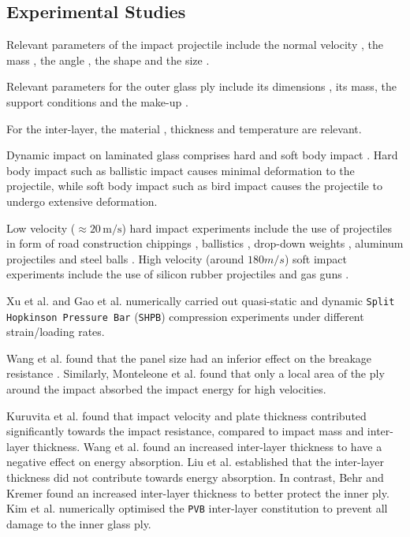\documentclass[format=acmtog, 12pt, screen=true, review=false]{acmart}
\begin{document}

\subsection{Experimental Studies}

Relevant parameters of the impact projectile include the normal velocity \cite{Gra98, Kur14, Dar13, Wu14}, the mass \cite{Kur14, Dar13}, the angle \cite{Gra98, Kur14, Dar13}, the shape \cite{Dar13} and the size \cite{Wu14}.

\bigbreak
Relevant parameters for the outer glass ply include its dimensions \cite{Wan18}, its mass, the support conditions \cite{Wan18} and the make-up \cite{Wan18}.

\bigbreak
For the inter-layer, the material \cite{Moh18, Wan18, Mon04}, thickness \cite{Ji98, Kur14, Wan18} and temperature \cite{Moh18, Zha19} are relevant.

\bigbreak
Dynamic impact on laminated glass comprises hard and soft body impact \cite{Moh17}. Hard body impact such as ballistic impact \cite{Bra10} causes minimal deformation to the projectile, while soft body impact such as bird impact \cite{Moh17} causes the projectile to undergo extensive deformation.

\bigbreak
Low velocity ($\approx 20\,\mathrm{m}/\mathrm{s}$) hard impact experiments include the use of projectiles in form of road construction chippings \cite{Gra98}, ballistics \cite{Mon04}, drop-down weights \cite{Che15, Mil12, Wan18}, aluminum projectiles \cite{Mil12} and steel balls \cite{Beh99, Flo98, Wan18}. High velocity (around $180 m/s$) soft impact experiments include the use of silicon rubber projectiles \cite{Moh17} and gas guns \cite{Moh18}.

\bigbreak
Xu et al. \cite{Xu11} and Gao et al. \cite{Gao14} numerically carried out quasi-static and dynamic \texttt{Split Hopkinson Pressure Bar} (\texttt{SHPB}) compression experiments under different strain/loading rates. 

\bigbreak
Wang et al. \cite{Wan18} found that the panel size had an inferior effect on the breakage resistance \cite{Wan18}. Similarly, Monteleone et al. \cite{Mon04} found that only a local area of the ply around the impact absorbed the impact energy for high velocities.

\bigbreak
Kuruvita et al. \cite{Kur14} found that impact velocity and plate thickness contributed significantly towards the impact resistance, compared to impact mass and inter-layer thickness. Wang et al. \cite{Wan18} found an increased inter-layer thickness to have a negative effect on energy absorption. Liu et al. \cite{Liu16} established that the inter-layer thickness did not contribute towards energy absorption. In contrast, Behr and Kremer \cite{Beh99} found an increased inter-layer thickness to better protect the inner ply. Kim et al. \cite{Kim16} numerically optimised the \texttt{PVB} inter-layer constitution to prevent all damage to the inner glass ply.
\end{document}
